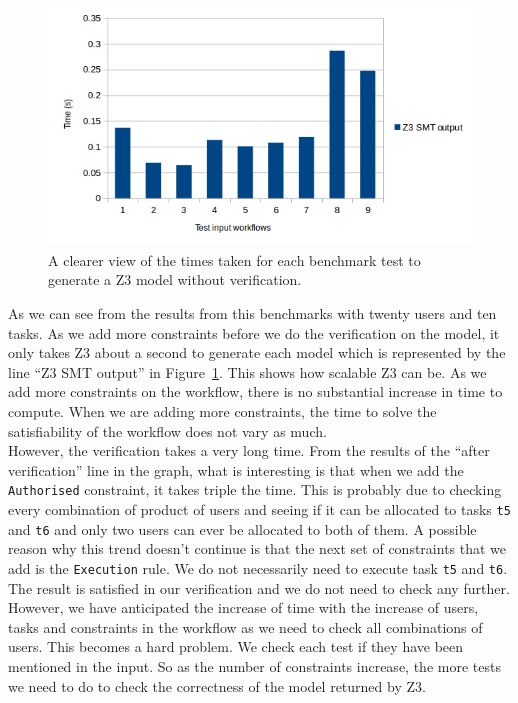 \documentclass[a4paper]{report}
\begin{document}
\begin{figure}[!h]
\includegraphics[scale=1]{Z3_smt_benchmark.png}
\caption{A clearer view of the times taken for each benchmark test to generate a Z3 model without verification.}
\label{fig:smt output}
\end{figure}

As we can see from the results from this benchmarks with twenty users and ten tasks. As we add more constraints before we do the verification on the model, it only takes Z3 about a second to generate each model which is represented by the line ``Z3 SMT output'' in Figure~\ref{fig:smt output}. This shows how scalable Z3 can be. As we add more constraints on the workflow, there is no substantial increase in time to compute. When we are adding more constraints, the time to solve the satisfiability of the workflow does not vary as much. \\

However, the verification takes a very long time. From the results of the ``after verification'' line in the graph, what is interesting is that when we add the \texttt{Authorised} constraint, it takes triple the time. This is probably due to checking every combination of product of users and seeing if it can be allocated to tasks \texttt{t5} and \texttt{t6} and only two users can ever be allocated to both of them. A possible reason why this trend doesn't continue is that the next set of constraints that we add is the \texttt{Execution} rule. We do not necessarily need to execute task \texttt{t5} and \texttt{t6}. The result is satisfied in our verification and we do not need to check any further.\\

However, we have anticipated the increase of time with the increase of users, tasks and constraints in the workflow as we need to check all combinations of users. This becomes a hard problem. We check each test if they have been mentioned in the input. So as the number of constraints increase, the more tests we need to do to check the correctness of the model returned by Z3.
\end{document}
